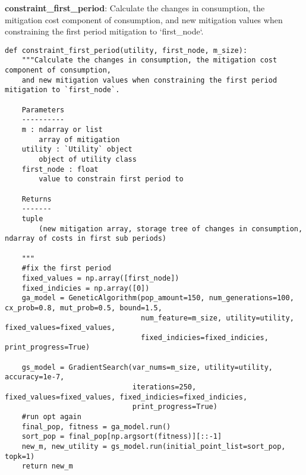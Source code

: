\documentclass[12pt]{article}
\begin{document}
\textbf{constraint\_first\_period}:  Calculate the changes in consumption, the mitigation cost component of consumption,
	and new mitigation values when constraining the first period mitigation to `first\_node`.
\begin{verbatim}
def constraint_first_period(utility, first_node, m_size):
	"""Calculate the changes in consumption, the mitigation cost component of consumption,
	and new mitigation values when constraining the first period mitigation to `first_node`.

	Parameters
	----------
	m : ndarray or list
		array of mitigation
	utility : `Utility` object
		object of utility class
	first_node : float
		value to constrain first period to
	
	Returns
	-------
	tuple
		(new mitigation array, storage tree of changes in consumption, ndarray of costs in first sub periods)

	"""
	#fix the first period
	fixed_values = np.array([first_node])
	fixed_indicies = np.array([0])
	ga_model = GeneticAlgorithm(pop_amount=150, num_generations=100, cx_prob=0.8, mut_prob=0.5, bound=1.5,
								num_feature=m_size, utility=utility, fixed_values=fixed_values,
								fixed_indicies=fixed_indicies, print_progress=True)

	gs_model = GradientSearch(var_nums=m_size, utility=utility, accuracy=1e-7,
							  iterations=250, fixed_values=fixed_values, fixed_indicies=fixed_indicies,
							  print_progress=True)
	#run opt again
	final_pop, fitness = ga_model.run()
	sort_pop = final_pop[np.argsort(fitness)][::-1]
	new_m, new_utility = gs_model.run(initial_point_list=sort_pop, topk=1)
	return new_m
\end{verbatim}
\end{document}
